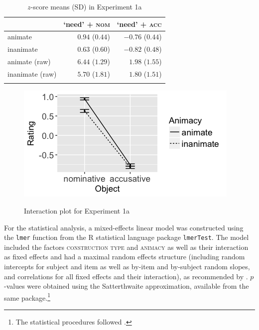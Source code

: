 \documentclass[output=paper]{langscibook}
\begin{document}
\begin{table}
\centering
\begin{tabularx}{0.65\textwidth}{Xrr}
\lsptoprule
 & `need' + \textsc{nom} & `need' + \textsc{acc}\\
\midrule
animate  &   $0.94$ ($0.44$) &   $-0.76$ ($0.44$)\\
inanimate  &   $0.63$ ($0.60$) &   $-0.82$ ($0.48$)\\
animate (raw)  &   $6.44$ ($1.29$) &   $1.98$ ($1.55$)\\
inanimate (raw)  &   $5.70$ ($1.81$) &   $1.80$ ($1.51$)\\
\lspbottomrule
\end{tabularx}
\caption{$z$-score means (SD) in Experiment 1a}
\label{tab:1:means-exp1a}
\end{table}

\begin{figure}
\caption{Interaction plot for Experiment 1a}
\centering
\includegraphics[scale = 0.5]{figures/exp1a_13.png}
\label{fig:exp1a}
\end{figure}

For the statistical analysis, a mixed-effects linear model was constructed using the \texttt{lmer} function from the R statistical language package \texttt{lmerTest}. The model included the factors \textsc{construction type} and \textsc{animacy} as well as their interaction as fixed effects and had a maximal random effects structure (including random intercepts for subject and item as well as by-item and by-subject random slopes, and correlations for all fixed effects and their interaction), as recommended by \citet{Barr.Levy2013}. $p$-values were obtained using the Satterthwaite approximation, available from the same package.\footnote{The statistical procedures followed \citet{Keshev.meltzerAsscher2019}.}
\end{document}
